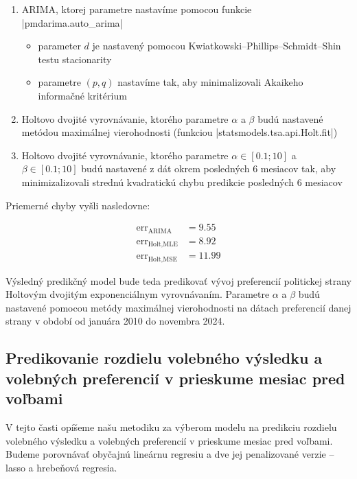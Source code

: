 \documentclass[main.tex]{subfiles}
\begin{document}
\begin{enumerate}
	\item ARIMA, ktorej parametre nastavíme pomocou funkcie \pyth|pmdarima.auto_arima|
	\begin{itemize}
		\item parameter $d$ je nastavený pomocou Kwiatkowski–Phillips–Schmidt–Shin testu stacionarity\\ 
		\item parametre $(p,q)$ nastavíme tak, aby minimalizovali Akaikeho informačné kritérium
	\end{itemize}
	\item Holtovo dvojité vyrovnávanie, ktorého parametre $\alpha$ a $\beta$ budú nastavené metódou maximálnej vierohodnosti (funkciou \pyth|statsmodels.tsa.api.Holt.fit|)
	\item Holtovo dvojité vyrovnávanie, ktorého parametre $\alpha \in [0.1;10] $ a $\beta \in [0.1;10]$ budú nastavené z dát okrem posledných 6 mesiacov tak, aby minimizalizovali strednú kvadratickú chybu predikcie posledných 6 mesiacov
\end{enumerate}

Priemerné chyby vyšli nasledovne:

\begin{align*}
	\operatorname{err}_{\operatorname{ARIMA}} &= 9.55 \\
	\operatorname{err}_{\operatorname{Holt, MLE}} &= 8.92 \\
	\operatorname{err}_{\operatorname{Holt, MSE}} &= 11.99
\end{align*}

Výsledný predikčný model bude teda predikovať vývoj preferencií politickej strany Holtovým dvojitým exponenciálnym vyrovnávaním. Parametre $\alpha$ a $\beta$ budú nastavené pomocou metódy maximálnej vierohodnosti na dátach preferencií danej strany v období od januára 2010 do novembra 2024.


\subsection{Predikovanie rozdielu volebného výsledku a volebných preferencií v prieskume mesiac pred voľbami}

V tejto časti opíšeme našu metodiku za výberom modelu na predikciu rozdielu volebného výsledku a volebných preferencií v prieskume mesiac pred voľbami. Budeme porovnávať obyčajnú lineárnu regresiu a dve jej penalizované verzie -- lasso a hrebeňová regresia.
\end{document}
